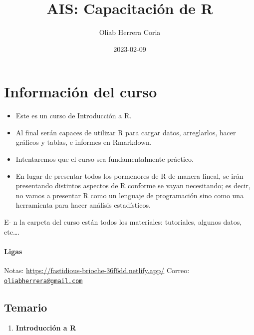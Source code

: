 \documentclass[
]{book}
\title{AIS: Capacitación de R}
\author{Oliab Herrera Coria}
\date{2023-02-09}
\providecommand{\tightlist}{%
  \setlength{\itemsep}{0pt}\setlength{\parskip}{0pt}}
\begin{document}
\maketitle

{
\setcounter{tocdepth}{1}
\tableofcontents
}
\hypertarget{informaciuxf3n-del-curso}{%
\chapter*{Información del curso}\label{informaciuxf3n-del-curso}}

\begin{itemize}
\item
  Este es un curso de Introducción a R.
\item
  Al final serán capaces de utilizar R para cargar datos, arreglarlos, hacer gráficos y tablas, e informes en Rmarkdown.
\item
  Intentaremos que el curso sea fundamentalmente práctico.
\item
  En lugar de presentar todos los pormenores de R de manera lineal, se irán presentando distintos aspectos de R conforme se vayan necesitando; es decir, no vamos a presentar R como un lenguaje de programación sino como una herramienta para hacer análisis estadísticos.
\end{itemize}

E- n la carpeta del curso están todos los materiales: tutoriales, algunos datos, etc\ldots.

\hypertarget{ligas}{%
\subsubsection*{Ligas}\label{ligas}}

Notas: \url{https://fastidious-brioche-36f6dd.netlify.app/}
Correo: \href{mailto:oliabherrera@gmail.com}{\nolinkurl{oliabherrera@gmail.com}}

\hypertarget{temario}{%
\section*{Temario}\label{temario}}

\begin{enumerate}
\def\labelenumi{\arabic{enumi}.}
\tightlist
\item
  \textbf{Introducción a R}
\end{enumerate}
\end{document}
